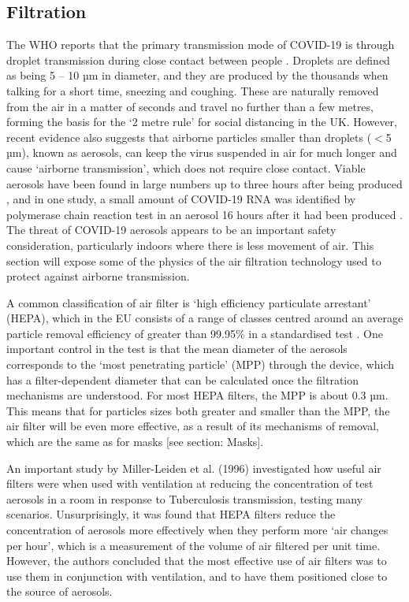 \documentclass[11pt]{report}
\begin{document}
			
			
			
			\subsection{Filtration}
The WHO reports that the primary transmission mode of COVID-19 is through droplet transmission during close contact between people \cite{filt1}. Droplets are defined as being 5 – 10 µm in diameter, and they are produced by the thousands \cite{filt2} when talking for a short time, sneezing and coughing. These are naturally removed from the air in a matter of seconds and travel no further than a few metres, forming the basis for the ‘2 metre rule’ for social distancing in the UK. However, recent evidence also suggests that airborne particles smaller than droplets ($<$5 µm), known as aerosols, can keep the virus suspended in air for much longer and cause ‘airborne transmission’, which does not require close contact. Viable aerosols have been found in large numbers up to three hours after being produced \cite{filt3}, and in one study, a small amount of COVID-19 RNA was identified by polymerase chain reaction test in an aerosol 16 hours after it had been produced \cite{filt4}. The threat of COVID-19 aerosols appears to be an important safety consideration, particularly indoors where there is less movement of air. This section will expose some of the physics of the air filtration technology used to protect against airborne transmission.

A common classification of air filter is ‘high efficiency particulate arrestant’ (HEPA), which in the EU consists of a range of classes centred around an average particle removal efficiency of greater than 99.95\% in a standardised test \cite{filt5}. One important control in the test is that the mean diameter of the aerosols corresponds to the ‘most penetrating particle’ (MPP) through the device, which has a filter-dependent diameter that can be calculated once the filtration mechanisms are understood. For most HEPA filters, the MPP is about 0.3 µm. This means that for particles sizes both greater and smaller than the MPP, the air filter will be even more effective, as a result of its mechanisms of removal, which are the same as for masks [see section: Masks].

An important study by Miller-Leiden et al. (1996) \cite{filt6} investigated how useful air filters were when used with ventilation at reducing the concentration of test aerosols in a room in response to Tuberculosis transmission, testing many scenarios. Unsurprisingly, it was found that HEPA filters reduce the concentration of aerosols more effectively when they perform more ‘air changes per hour’, which is a measurement of the volume of air filtered per unit time. However, the authors concluded that the most effective use of air filters was to use them in conjunction with ventilation, and to have them positioned close to the source of aerosols.
			
\end{document}
